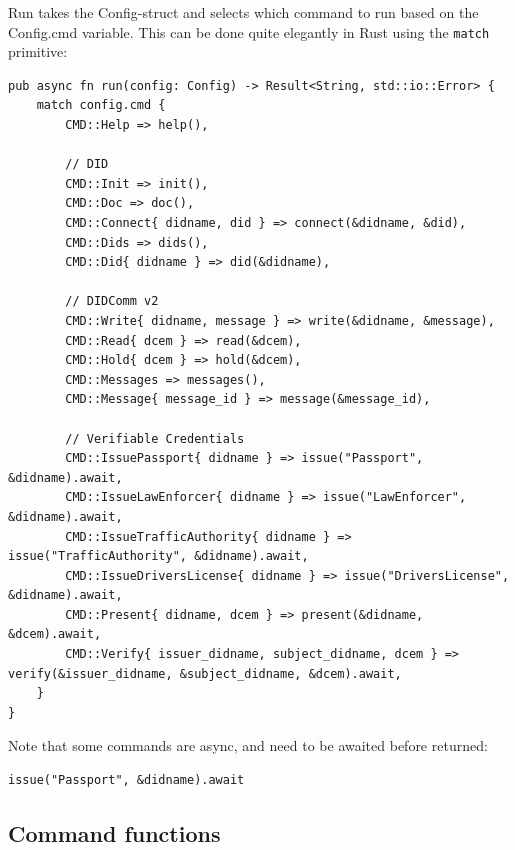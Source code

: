 Run takes the Config-struct and selects which command to run based on
the Config.cmd variable. This can be done quite elegantly in Rust using
the \lstinline!match! primitive:

\begin{lstlisting}
pub async fn run(config: Config) -> Result<String, std::io::Error> {
    match config.cmd {
        CMD::Help => help(),

        // DID
        CMD::Init => init(),
        CMD::Doc => doc(),
        CMD::Connect{ didname, did } => connect(&didname, &did),
        CMD::Dids => dids(),
        CMD::Did{ didname } => did(&didname),

        // DIDComm v2
        CMD::Write{ didname, message } => write(&didname, &message),
        CMD::Read{ dcem } => read(&dcem),
        CMD::Hold{ dcem } => hold(&dcem),
        CMD::Messages => messages(),
        CMD::Message{ message_id } => message(&message_id),

        // Verifiable Credentials
        CMD::IssuePassport{ didname } => issue("Passport", &didname).await,
        CMD::IssueLawEnforcer{ didname } => issue("LawEnforcer", &didname).await,
        CMD::IssueTrafficAuthority{ didname } => issue("TrafficAuthority", &didname).await,
        CMD::IssueDriversLicense{ didname } => issue("DriversLicense", &didname).await,
        CMD::Present{ didname, dcem } => present(&didname, &dcem).await,
        CMD::Verify{ issuer_didname, subject_didname, dcem } => verify(&issuer_didname, &subject_didname, &dcem).await,
    }
}
\end{lstlisting}

Note that some commands are async, and need to be awaited before returned:

\begin{lstlisting}
issue("Passport", &didname).await
\end{lstlisting}





\pagebreak





\hypertarget{command-functions}{%
\subsection{Command functions}\label{command-functions}}

